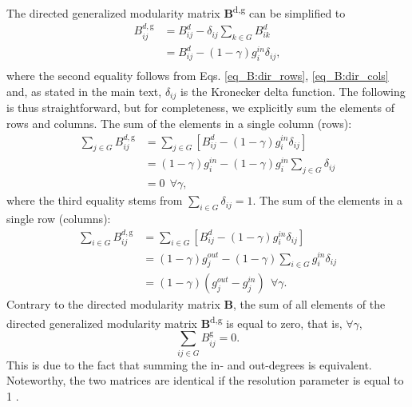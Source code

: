 \documentclass[pdflatex,sn-mathphys-num]{sn-jnl}%
\begin{document}
The directed generalized modularity matrix \textbf{B}\textsuperscript{d,g} can be simplified to
\begin{equation} \label{eq_B:dire_gen_mod_full_G}
    \begin{split}
    B^{d,\text{g}}_{ij} & = B_{ij}^d - \delta_{ij}\sum_{k \in G} B_{ik}^d \\
                      & = B_{ij}^d - (1-\gamma)g_{i}^{in}\delta_{ij}, \\
    \end{split}
\end{equation} where the second equality follows from Eqs. \ref{eq_B:dir_rows}, \ref{eq_B:dir_cols} and, as stated in the main text, $\delta_{ij}$ is the Kronecker delta function. The following is thus straightforward, but for completeness, we explicitly sum the elements of rows and columns. The sum of the elements in a single column (rows):
\begin{equation}\label{eq_B:gen_dir_rows_full_g}
    \begin{split}
    \sum_{j \in G} B^{d,\text{g}}_{ij} & = \sum_{j \in G} \left[ B_{ij}^d - (1-\gamma)g_{i}^{in}\delta_{ij} \right ]\\
                                     & = (1 - \gamma)g_i^{in} - (1 - \gamma)g_i^{in} \sum_{j \in G} \delta_{ij} \\
                                     & = 0 \ \ \forall \gamma,
    \end{split}
\end{equation} where the third equality stems from $\sum_{i \in G} \delta_{ij}=1$. The sum of the elements in a single row (columns): 
\begin{equation}\label{eq_B:gen_dir_cols_full_g}
    \begin{split}
    \sum_{i \in G} B^{d,\text{g}}_{ij} & = \sum_{i \in G} \left[ B_{ij}^d - (1-\gamma)g_{i}^{in}\delta_{ij} \right ] \\
                                     & = (1-\gamma)g_j^{out} - (1-\gamma) \sum_{i \in G} g_i^{in}\delta_{ij} \\
                                     & = (1-\gamma)(g_j^{out}-g_j^{in}) \ \ \forall \gamma.
    \end{split}
\end{equation} Contrary to the directed modularity matrix \textbf{B}, the sum of all elements of the directed generalized modularity matrix \textbf{B}\textsuperscript{d,g} is equal to zero, that is,  $\forall \gamma$,
\begin{equation} \label{eq_B:gen_dir_elements_full_g}
    \sum_{ij \in G}B^{\text{g}}_{ij}=0.
\end{equation} This is due to the fact that summing the in- and out-degrees is equivalent. Noteworthy, the two matrices are identical if the resolution parameter is equal to 1 \cite{Leicht2008}.
\end{document}
